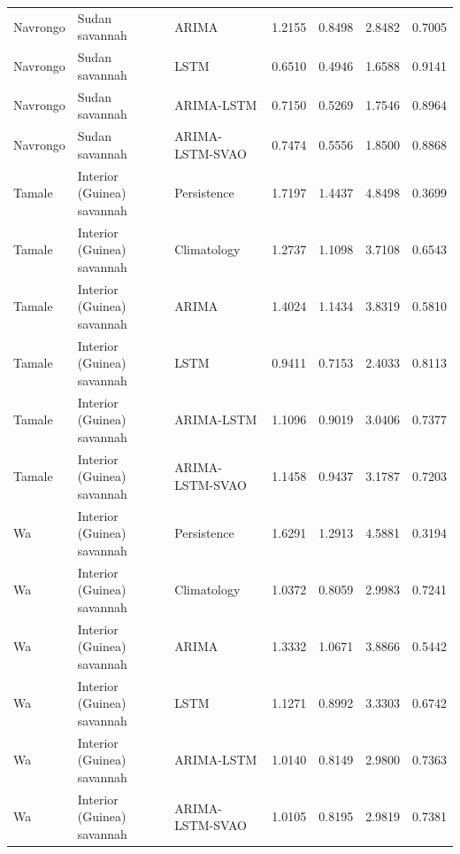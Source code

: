 \begin{table}[H]
\begin{singlespace}
\begin{tabular}{lllrrrr}
Navrongo & Sudan savannah & ARIMA & 1.2155 & 0.8498 & 2.8482 & 0.7005 \\
Navrongo & Sudan savannah & LSTM & 0.6510 & 0.4946 & 1.6588 & 0.9141 \\
Navrongo & Sudan savannah & ARIMA-LSTM & 0.7150 & 0.5269 & 1.7546 & 0.8964 \\
Navrongo & Sudan savannah & ARIMA-LSTM-SVAO & 0.7474 & 0.5556 & 1.8500 & 0.8868 \\
Tamale & Interior (Guinea) savannah & Persistence & 1.7197 & 1.4437 & 4.8498 & 0.3699 \\
Tamale & Interior (Guinea) savannah & Climatology & 1.2737 & 1.1098 & 3.7108 & 0.6543 \\
Tamale & Interior (Guinea) savannah & ARIMA & 1.4024 & 1.1434 & 3.8319 & 0.5810 \\
Tamale & Interior (Guinea) savannah & LSTM & 0.9411 & 0.7153 & 2.4033 & 0.8113 \\
Tamale & Interior (Guinea) savannah & ARIMA-LSTM & 1.1096 & 0.9019 & 3.0406 & 0.7377 \\
Tamale & Interior (Guinea) savannah & ARIMA-LSTM-SVAO & 1.1458 & 0.9437 & 3.1787 & 0.7203 \\
Wa & Interior (Guinea) savannah & Persistence & 1.6291 & 1.2913 & 4.5881 & 0.3194 \\
Wa & Interior (Guinea) savannah & Climatology & 1.0372 & 0.8059 & 2.9983 & 0.7241 \\
Wa & Interior (Guinea) savannah & ARIMA & 1.3332 & 1.0671 & 3.8866 & 0.5442 \\
Wa & Interior (Guinea) savannah & LSTM & 1.1271 & 0.8992 & 3.3303 & 0.6742 \\
Wa & Interior (Guinea) savannah & ARIMA-LSTM & 1.0140 & 0.8149 & 2.9800 & 0.7363 \\
Wa & Interior (Guinea) savannah & ARIMA-LSTM-SVAO & 1.0105 & 0.8195 & 2.9819 & 0.7381 \\
\bottomrule
\end{tabular}
\end{singlespace}
\end{table}
